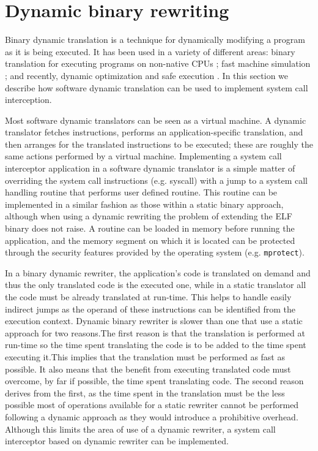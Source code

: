 \section{Dynamic binary rewriting}
\label{dynamic_rewriting}

Binary dynamic translation is a technique for dynamically modifying a program as it is being executed. It has been used in a variety of different areas: binary translation for executing programs on non-native CPUs  \cite{Ebcioglu97daisy:dynamic}; fast machine simulation \cite{Witchel96embra:fast}; and recently, dynamic optimization and safe execution \cite{DynamoRio, Strata, vx32}. In this section we describe how software dynamic translation can be used to implement system call interception.

Most software dynamic translators can be seen as a virtual machine. A dynamic translator fetches instructions, performs an application-specific translation, and then arranges for the translated instructions to be executed; these are roughly the same actions performed by a virtual machine. Implementing a system call interceptor application in a software dynamic translator is a simple matter of overriding the system call instructions (e.g. syscall) with a jump to a system call handling routine that performs user defined routine. This routine can be implemented in a similar fashion as those within a static binary approach, although when using a dynamic rewriting the problem of extending the ELF binary does not raise. A routine can be loaded in memory before running the application, and the memory segment on which it is located can be protected through the security features provided by the operating system (e.g. \lstinline$mprotect$). 

In a binary dynamic rewriter, the application’s code is translated on demand and thus the only translated code is the executed one, while in a static translator all the code must be already translated at run-time. This helps to handle easily indirect jumps as the operand of these instructions can be identified from the execution context. Dynamic binary rewriter is slower than one that use a static approach for two reasons.The first reason is that the translation is performed at run-time so the time spent translating the code is to be added to  the time spent executing it.This implies that the translation must be performed as fast as possible. It also means that the benefit from executing translated code must overcome, by far if possible, the time spent translating code. The second reason derives from the first, as the time spent in the translation must be the less possible most of operations available for a static rewriter cannot be performed following a dynamic approach as they would introduce a prohibitive overhead.  Although this limits the area of use of a dynamic rewriter, a system call interceptor based on dynamic rewriter can be implemented. 

